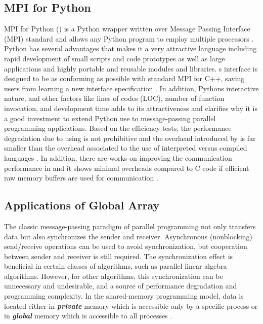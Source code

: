 \label{background}

\subsection{MPI for Python }
MPI for Python () is a Python wrapper written over Message Passing Interface (MPI) standard and allows any Python program to employ multiple processors \cite{Dalcin:2011aa, Dalcin:2005aa}.
Python has several advantages that makes it a very attractive language including rapid development of small scripts and code prototypes as well as large applications and highly portable and reusable modules and libraries.
\textsc{}s interface is designed to be as conforming as possible with standard MPI for C++, saving users from learning a new interface specification \cite{GAiN}. 
In addition, Python\textsc{}s interactive nature, and other factors like lines of codes (LOC), number of function invocation, and development time adds to its attractiveness and clarifies why it is a good investment to extend Python use to message-passing parallel programming applications.
Based on the efficiency tests, the performance degradation due to using  is not prohibitive and the overhead introduced by  is far smaller than the overhead associated to the use of interpreted versus compiled languages \cite{GAiN}.
In addition, there are works on improving the communication performance in  and it shows minimal overheads compared to C code if efficient raw memory buffers are used for communication \cite{Dalcin:2011aa}.

\subsection{Applications of Global Array}
The classic message-passing paradigm of parallel programming not only transfers data but also synchronizes the sender and receiver. 
Asynchronous (nonblocking) send/receive operations can be used to avoid synchronization, but cooperation between sender and receiver is still required. 
The synchronization effect is beneficial in certain classes of algorithms, such as parallel linear algebra algorithms.
However, for other algorithms, this synchronization can be unnecessary and undesirable, and a source of performance degradation and programming complexity. 
In the shared-memory programming model, data is located either in \textbf{\textit{private}} memory which is accessible only by a specific process or in \textbf{\textit{global}} memory which is accessible to all processes \cite{GA}. 

